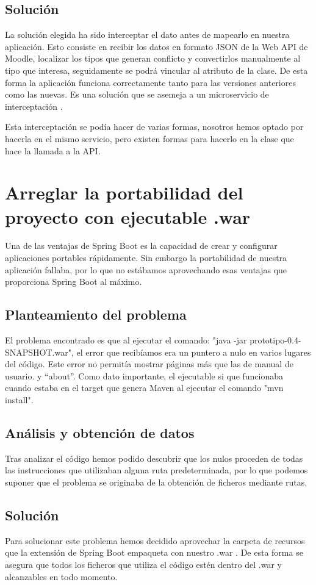\subsection{Solución}
La solución elegida ha sido interceptar el dato antes de mapearlo en nuestra aplicación. Esto consiste en recibir los datos en formato JSON de la Web API de Moodle, localizar los tipos que generan conflicto y convertirlos manualmente al tipo que interesa, seguidamente se podrá vincular al atributo de la clase. De esta forma la aplicación funciona correctamente tanto para las versiones anteriores como las nuevas. Es una solución que se asemeja a un microservicio de interceptación \cite{interceptor}.

Esta interceptación se podía hacer de varias formas, nosotros hemos optado por hacerla en el mismo servicio, pero existen formas para hacerlo en la clase que hace la llamada a la API\cite{spring-interceptor}.

\section{Arreglar la portabilidad del proyecto con ejecutable .war}
Una de las ventajas de Spring Boot es la capacidad de crear y configurar aplicaciones portables rápidamente. Sin embargo la portabilidad de nuestra aplicación fallaba, por lo que no estábamos aprovechando esas ventajas que proporciona Spring Boot al máximo. 
\subsection{Planteamiento del problema}
El problema encontrado es que al ejecutar el comando: 
"java -jar prototipo-0.4-SNAPSHOT.war", el error que recibíamos era un puntero a nulo en varios lugares del código. Este error no permitía mostrar páginas más que las de manual de usuario. y ``about''. Como dato importante, el ejecutable si que funcionaba cuando estaba en el target que genera Maven al ejecutar el comando "mvn install".
\subsection{Análisis y obtención de datos}
Tras analizar el código hemos podido descubrir que los nulos proceden de todas las instrucciones que utilizaban alguna ruta predeterminada, por lo que podemos suponer que el problema se originaba de la obtención de ficheros mediante rutas. 

\subsection{Solución}
Para solucionar este problema hemos decidido aprovechar la carpeta de recursos que la extensión de Spring Boot empaqueta con nuestro .war \cite{read-file-from-resources}. De esta forma se asegura que todos los ficheros que utiliza el código estén dentro del .war y alcanzables en todo momento.

